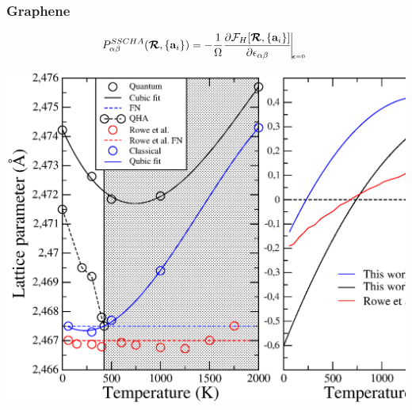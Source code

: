 \documentclass{beamer}
\begin{document}

\begin{frame}

\frametitle{Graphene}
\begin{equation}
\nonumber
 P_{\alpha\beta}^{SSCHA}(\boldsymbol{\mathcal{R}},\{\mathbf{a}_{i}\})=-\frac{1}{\Omega}\frac{\partial\mathcal{F}_{H}[\boldsymbol{\mathcal{R}},\{\mathbf{a}_{i}\}]}{\partial\epsilon_{\alpha\beta}}\vline_{_{_{_{_{_{_{_{
\boldsymbol{\epsilon}=0}}}}}}}}
\end{equation}
\begin{center}
 \includegraphics[width=0.65\linewidth]{Pictures/Graphene/lattice.eps}
\end{center}

\end{frame}

\end{document}

